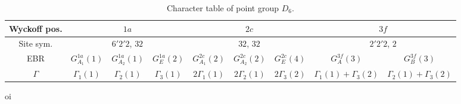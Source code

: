 \begin{table}[H]
\footnotesize
\caption{Character table of point group $D_6$.}
\centering
\begin{tabular}{|c|c|c|c|c|c|c|c|c|}
\hline
Wyckoff pos. & \multicolumn{3}{c|}{$1a$} & \multicolumn{3}{c|}{$2c$} & \multicolumn{2}{c|}{$3f$} \\
\hline
Site sym. & \multicolumn{3}{c|}{$6'2'2$, $32$} & \multicolumn{3}{c|}{$32$, $32$} & \multicolumn{2}{c|}{$2'2'2$, $2$} \\
\hline
EBR      & $G_{A_1}^{1a}(1)$ & $G_{A_2}^{1a}(1)$ & $G_{E}^{1a}(2)$ & $G_{A_1}^{2c}(2)$ & $G_{A_2}^{2c}(2)$ & $G_{E}^{2c}(4)$   & $G_{A}^{3f}(3)$ & $G_{B}^{3f}(3)$ \\
\hline
$\Gamma$ & $\Gamma_1(1)$ & $\Gamma_2(1)$ & $\Gamma_3(1)$ & $2\Gamma_1(1)$ & $2\Gamma_2(1)$ & $2\Gamma_3(2)$ & $\Gamma_1(1)+\Gamma_3(2)$ & $\Gamma_2(1)+\Gamma_3(2)$ \\
\hline
\end{tabular}
\label{tab:matbg-irreps}
\end{table}

oi



%
%
%
